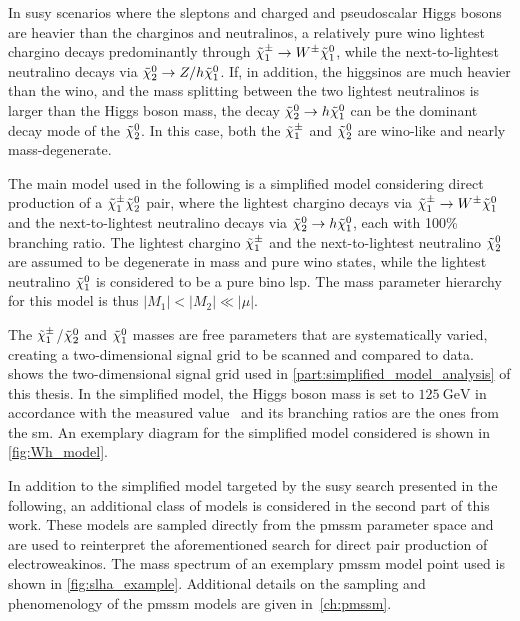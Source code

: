 
In \gls{susy} scenarios where the sleptons and charged and pseudoscalar Higgs bosons are heavier than the charginos and neutralinos, a relatively pure wino lightest chargino decays predominantly through $\tilde{\chi}_1^\pm\rightarrow W^\pm\tilde{\chi}_1^0$, while the next-to-lightest neutralino decays via $\tilde{\chi}_2^0\rightarrow Z/h\tilde{\chi}_1^0$. If, in addition, the higgsinos are much heavier than the wino, and the mass splitting between the two lightest neutralinos is larger than the Higgs boson mass, the decay $\tilde{\chi}_2^0\rightarrow h\tilde{\chi}_1^0$ can be the dominant decay mode of the $\tilde{\chi}_2^0$. In this case, both the $\tilde{\chi}_1^\pm$ and $\tilde{\chi}_2^0$ are wino-like and nearly mass-degenerate.

The main model used in the following is a simplified model considering direct production of a $\tilde{\chi}_1^\pm\tilde{\chi}_2^0$ pair, where the lightest chargino decays via $\tilde{\chi}_1^\pm\rightarrow W^\pm\tilde{\chi}_1^0$ and the next-to-lightest neutralino decays via $\tilde{\chi}_2^0\rightarrow h\tilde{\chi}_1^0$, each with 100\% branching ratio.
The lightest chargino $\tilde{\chi}_1^\pm$ and the next-to-lightest neutralino $\tilde{\chi}_2^0$ are assumed to be degenerate in mass and pure wino states, while the lightest neutralino $\tilde{\chi}_1^0$ is considered to be a pure bino \gls{lsp}.
The mass parameter hierarchy for this model is thus \mbox{$\vert M_1 \vert < \vert M_2 \vert \ll \vert\mu\vert$}. 

The $\tilde{\chi}_1^\pm$/$\tilde{\chi}_2^0$ and $\tilde{\chi}_1^0$ masses are free parameters that are systematically varied, creating a two-dimensional signal grid to be scanned and compared to data.  shows the two-dimensional signal grid used in \cref{part:simplified_model_analysis} of this thesis. In the simplified model, the Higgs boson mass is set to $\SI{125}{\GeV}$ in accordance with the measured value~\cite{Aad:2012tfa,Chatrchyan:2012ufa} and its branching ratios are the ones from the \gls{sm}. An exemplary diagram for the simplified model considered is shown in \cref{fig:Wh_model}.

In addition to the simplified model targeted by the \gls{susy} search presented in the following, an additional class of models is considered in the second part of this work. These models are sampled directly from the \gls{pmssm} parameter space and are used to reinterpret the aforementioned search for direct pair production of electroweakinos. The mass spectrum of an exemplary \gls{pmssm} model point used is shown in \cref{fig:slha_example}. Additional details on the sampling and phenomenology of the \gls{pmssm} models are given in~\cref{ch:pmssm}. 


